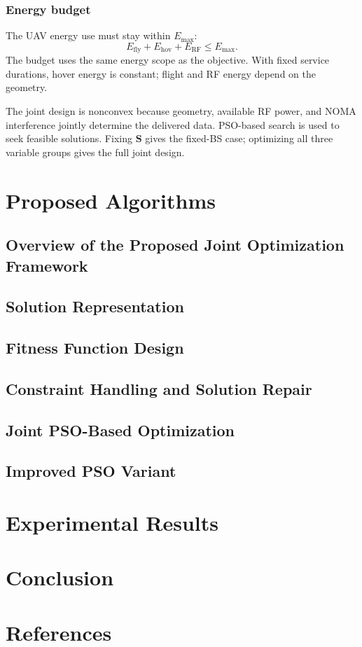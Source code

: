 \documentclass[conference]{IEEEtran}
\newcommand{\RF}{\mathrm{RF}}
\newcommand{\fly}{\mathrm{fly}}
\newcommand{\hov}{\mathrm{hov}}
\begin{document}
\subsubsection{Energy budget}
The UAV energy use must stay within $E_{\max}$:
\begin{equation}
E_{\fly}+E_{\hov}+E_{\RF}\le E_{\max}.
\tag{C6}\label{eq:c_budget}
\end{equation}
The budget uses the same energy scope as the objective. With fixed service durations, hover energy is constant; flight and RF energy depend on the geometry.

The joint design is nonconvex because geometry, available RF power, and NOMA interference jointly determine the delivered data. PSO-based search is used to seek feasible solutions. Fixing $\bm S$ gives the fixed-BS case; optimizing all three variable groups gives the full joint design.


\section{Proposed Algorithms}
\label{sec:algorithms}
\subsection{Overview of the Proposed Joint Optimization Framework}
\label{subsec:algorithm_overview}
\subsection{Solution Representation}
\label{subsec:solution_representation}
\subsection{Fitness Function Design}
\label{subsec:fitness_function}
\subsection{Constraint Handling and Solution Repair}
\label{subsec:constraint_handling}
\subsection{Joint PSO-Based Optimization}
\label{subsec:joint_pso}
\subsection{Improved PSO Variant}
\label{subsec:improved_pso}

\section{Experimental Results}
\label{sec:results}

\section{Conclusion}
\label{sec:conclusion}

\section*{References}
\end{document}
